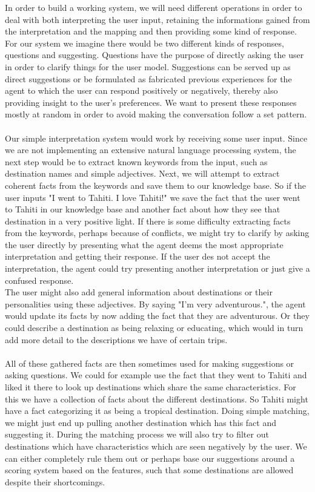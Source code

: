 \documentclass[11pt]{article} %
\begin{document}
In order to build a working system, we will need different operations in order to deal with both interpreting the user input, retaining the informations gained from the interpretation and the mapping and then providing some kind of response. For our system we imagine there would be two different kinds of responses, questions and suggesting. Questions have the purpose of directly asking the user in order to clarify things for the user model. Suggestions can be served up as direct suggestions or be formulated as fabricated previous experiences for the agent to which the user can respond positively or negatively, thereby also providing insight to the user's preferences.
We want to present these responses mostly at random in order to avoid making the conversation follow a set pattern.
\\
\\
Our simple interpretation system would work by receiving some user input. Since we are not implementing an extensive natural language processing system, the next step would be to extract known keywords from the input, such as destination names and simple adjectives. Next, we will attempt to extract coherent facts from the keywords and save them to our knowledge base. So if the user inputs "I went to Tahiti. I love Tahiti!"  we save the fact that the user went to Tahiti in our knowledge base and another fact about how they see that destination in a very positive light. If there is some difficulty extracting facts from the keywords, perhaps because of conflicts, we might try to clarify by asking the user directly by presenting what the agent deems the most appropriate interpretation and getting their response. If the user des not accept the interpretation, the agent could try presenting another interpretation or just give a confused response.
\\
The user might also add general information about destinations or their personalities using these adjectives. By saying "I'm very adventurous.", the agent would update its facts by now adding the fact that they are adventurous. Or they could describe a destination as being relaxing or educating, which would in turn add more detail to the descriptions we have of certain trips.
\\
\\
All of these gathered facts are then sometimes used for making suggestions or asking questions. We could for example use the fact that they went to Tahiti and liked it there to look up destinations which share the same characteristics. For this we have a collection of facts about the different destinations. So Tahiti might have a fact categorizing it as being a tropical destination. Doing simple matching, we might just end up pulling another destination which has this fact and suggesting it. During the matching process we will also try to filter out destinations which have characteristics which are seen negatively by the user. We can either completely rule them out or perhaps base our suggestions around a scoring system based on the features, such that some destinations are allowed despite their shortcomings.
\end{document}
